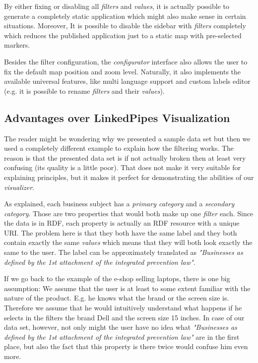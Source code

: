 By either fixing or disabling all \emph{filters} and \emph{values}, it is actually possible to generate a completely static application which might also make sense in certain situations. Moreover, It is possible to disable the sidebar with \emph{filters} completely which reduces the published application just to a static map with pre-selected markers.

Besides the filter configuration, the \emph{configurator} interface also allows the user to fix the default map position and zoom level. Naturally, it also implements the available universal features, like multi language support and custom labels editor (e.g. it is possible to rename \emph{filters}  and their \emph{values}).

\subsection{Advantages over LinkedPipes Visualization}

The reader might be wondering why we presented a sample data set but then we used a completely different example to explain how the filtering works. The reason is that the presented data set is if not actually broken then at least very confusing (its quality is a little poor). That does not make it very suitable for explaining principles, but it makes it perfect for demonstrating the abilities of our \emph{visualizer}.

As explained, each business subject has a \emph{primary category} and a \emph{secondary category}. Those are two properties that would both make up one \emph{filter} each. Since the data is in RDF, each property is actually an RDF resource with a unique URI. The problem here is that they both have the same label and they both contain exactly the same \emph{values} which means that they will both look exactly the same to the user. The label can be approximately translated as \textit{"Businesses as defined by the 1st attachment of the integrated prevention law"}.

If we go back to the example of the e-shop selling laptops, there is one big assumption: We assume that the user is at least to some extent familiar with the nature of the product. E.g. he knows what the brand or the screen size is. Therefore we assume that he would intuitively understand what happens if he selects in the filters the brand Dell and the screen size 15 inches. In case of our data set, however, not only might the user have no idea what \textit{"Businesses as defined by the 1st attachment of the integrated prevention law"} are in the first place, but also the fact that this property is there twice would confuse him even more. 

